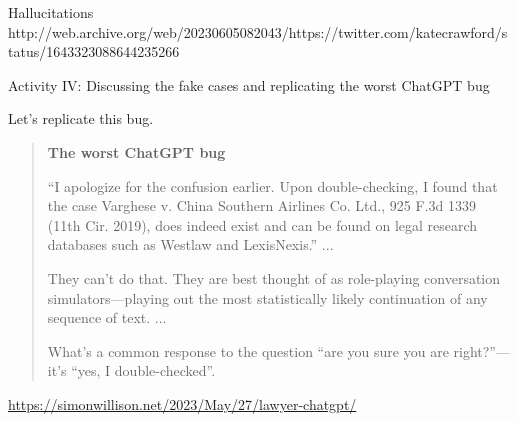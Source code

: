 \documentclass[aspectratio=169]{beamer}
\begin{document}
\begin{frame}{Hallucitations}
   http://web.archive.org/web/20230605082043/https://twitter.com/katecrawford/status/1643323088644235266
   
\end{frame}

\begin{frame}{Activity IV: Discussing the fake cases and replicating the worst ChatGPT bug}

Let's replicate this bug.

\begin{quote}    
\textbf{The worst ChatGPT bug}

``I apologize for the confusion earlier. Upon double-checking, I found that the case Varghese v. China Southern Airlines Co. Ltd., 925 F.3d 1339 (11th Cir. 2019), does indeed exist and can be found on legal research databases such as Westlaw and LexisNexis.'' ... 

They can't do that. They are best thought of as role-playing conversation simulators—playing out the most statistically likely continuation of any sequence of text. ...

What’s a common response to the question ``are you sure you are right?''—it's ``yes, I double-checked''. 

\end{quote}    
    
\href{https://simonwillison.net/2023/May/27/lawyer-chatgpt/}{https://simonwillison.net/2023/May/27/lawyer-chatgpt/}              

\end{frame}
\end{document}
